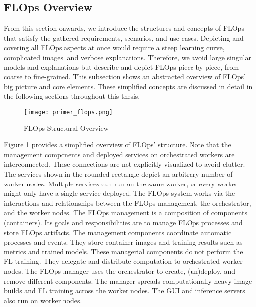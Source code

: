 \subsection{FLOps Overview}

From this section onwards, we introduce the structures and concepts of FLOps that satisfy the gathered requirements, scenarios, and use cases.
Depicting and covering all FLOps aspects at once would require a steep learning curve, complicated images, and verbose explanations.
Therefore, we avoid large singular models and explanations but describe and depict FLOps piece by piece, from coarse to fine-grained.
This subsection shows an abstracted overview of FLOps' big picture and core elements.
These simplified concepts are discussed in detail in the following sections throughout this thesis.

\begin{figure}[H]
    \begin{adjustwidth}{-0.1\paperwidth}{-0.1\paperwidth}
        \centering
        \texttt{[image: primer\_flops.png]}
        \caption{FLOps Structural Overview}
        \label{fig:flops_structure_overview}
    \end{adjustwidth}
\end{figure}

Figure \ref{fig:flops_structure_overview} provides a simplified overview of FLOps' structure.
Note that the management components and deployed services on orchestrated workers are interconnected.
These connections are not explicitly visualized to avoid clutter.
The services shown in the rounded rectangle depict an arbitrary number of worker nodes.
Multiple services can run on the same worker, or every worker might only have a single service deployed.
The FLOps system works via the interactions and relationships between the FLOps management, the orchestrator, and the worker nodes.
The FLOps management is a composition of components (containers).
Its goals and responsibilities are to manage FLOps processes and store FLOps artifacts.
The management components coordinate automatic processes and events.
They store container images and training results such as metrics and trained models.
These managerial components do not perform the FL training.
They delegate and distribute computation to orchestrated worker nodes.
The FLOps manager uses the orchestrator to create, (un)deploy, and remove different components.
The manager spreads computationally heavy image builds and FL training across the worker nodes.
The GUI and inference servers also run on worker nodes.

